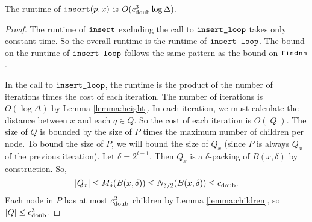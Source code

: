 \documentclass[../main.tex]{subfiles}
\newcommand{\aspect}[1]{\Delta}
\newcommand{\doubnum}{c_\textnormal{doub}}
\newcommand{\mkprocedure}[1]{\textnormal{\ttfamily {#1}}}
\newcommand{\findnn}{\mkprocedure{findnn}}
\newcommand{\ctinsert}{\ensuremath{\textnormal{\ttfamily insert}}}
\newcommand{\ctinsertloop}{\ensuremath{\textnormal{\ttfamily insert\_loop}}}
\begin{document}
\begin{theorem}
    The runtime of $\ctinsert(p,x)$ is $O(\doubnum^3 \log\aspect{})$.
\end{theorem}

\begin{proof}
    The runtime of $\ctinsert$ excluding the call to $\ctinsertloop$ takes only constant time.
    So the overall runtime is the runtime of $\ctinsertloop$.
    The bound on the runtime of $\ctinsertloop$ follows the same pattern as the bound on $\findnn$.

    In the call to $\ctinsertloop$, the runtime is the product of the number of iterations times the cost of each iteration.
    The number of iterations is $O(\log\aspect{})$ by Lemma \ref{lemma:height}.
    In each iteration, we must calculate the distance between $x$ and each $q\in Q$.
    So the cost of each iteration is $O(|Q|)$.
    The size of $Q$ is bounded by the size of $P$ times the maximum number of children per node.
    To bound the size of $P$, we will bound the size of $Q_x$ (since $P$ is always $Q_x$ of the previous iteration).
    Let $\delta=2^{i-1}$.
    Then $Q_x$ is a $\delta$-packing of $B(x,\delta)$ by construction.
    So,
    \begin{equation}
        |Q_x| \le M_\delta(B(x,\delta)) \le N_{\delta/2}(B(x,\delta)) \le \doubnum.
    \end{equation}
    Each node in $P$ has at most $\doubnum^2$ children by Lemma \ref{lemma:children},
    so $|Q| \le \doubnum^3$.

\end{proof}
\end{document}
